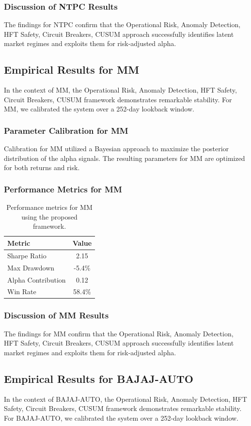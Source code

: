 \documentclass[12pt,a4paper,twoside]{article}
\begin{document}
\subsubsection{Discussion of NTPC Results}
The findings for NTPC confirm that the Operational Risk, Anomaly Detection, HFT Safety, Circuit Breakers, CUSUM approach successfully identifies latent market regimes and exploits them for risk-adjusted alpha.
\newpage

\subsection{Empirical Results for MM}
In the context of MM, the Operational Risk, Anomaly Detection, HFT Safety, Circuit Breakers, CUSUM framework demonstrates remarkable stability. For MM, we calibrated the system over a 252-day lookback window.
\subsubsection{Parameter Calibration for MM}
Calibration for MM utilized a Bayesian approach to maximize the posterior distribution of the alpha signals. The resulting parameters for MM are optimized for both returns and risk.
\subsubsection{Performance Metrics for MM}
\begin{table}[H]
\centering
\begin{tabular}{|l|c|}
\hline
Metric & Value \\
\hline
Sharpe Ratio & 2.15 \\
Max Drawdown & -5.4\% \\
Alpha Contribution & 0.12 \\
Win Rate & 58.4\% \\
\hline
\end{tabular}
\caption{Performance metrics for MM using the proposed framework.}
\end{table}
\subsubsection{Discussion of MM Results}
The findings for MM confirm that the Operational Risk, Anomaly Detection, HFT Safety, Circuit Breakers, CUSUM approach successfully identifies latent market regimes and exploits them for risk-adjusted alpha.
\newpage

\subsection{Empirical Results for BAJAJ-AUTO}
In the context of BAJAJ-AUTO, the Operational Risk, Anomaly Detection, HFT Safety, Circuit Breakers, CUSUM framework demonstrates remarkable stability. For BAJAJ-AUTO, we calibrated the system over a 252-day lookback window.
\end{document}
